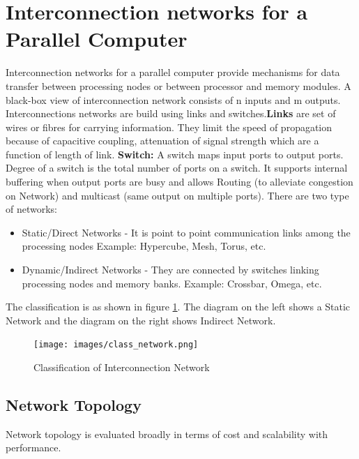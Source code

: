 \documentclass[12pt]{article}
\begin{document}
\section{Interconnection networks for a Parallel Computer}
Interconnection networks for a parallel computer provide mechanisms for data transfer between processing nodes or between
processor and memory modules. A black-box view of interconnection network consists of n inputs and m outputs. Interconnections networks are build using links and switches.\textbf{Links} are set of wires 
or fibres for carrying information. They limit the speed of propagation because of capacitive coupling, attenuation of signal strength 
which are a function of length of link. \textbf{Switch: }A switch maps input ports to output ports. Degree of a switch is the total number of ports on a switch.
It supports internal buffering when output ports are busy and allows Routing (to alleviate congestion on Network) and 
multicast (same output on multiple ports). There are two type of networks:
\begin{itemize}
    \item Static/Direct Networks - It is point to point communication links among the processing nodes Example: Hypercube, Mesh, Torus, etc.
    \item Dynamic/Indirect Networks - They are connected by switches linking processing nodes and memory banks. Example: Crossbar, Omega, etc.
\end{itemize}
The classification is as shown in figure \ref{fig:class_network}. The diagram on the left shows a Static Network and the diagram on the right shows Indirect Network.
\begin{figure}[H]
    \centering
    \texttt{[image: images/class\_network.png]}
    \caption{Classification of Interconnection Network}
    \label{fig:class_network}
\end{figure}

\subsection{Network Topology}
Network topology is evaluated broadly in terms of cost and scalability with performance.
\end{document}
